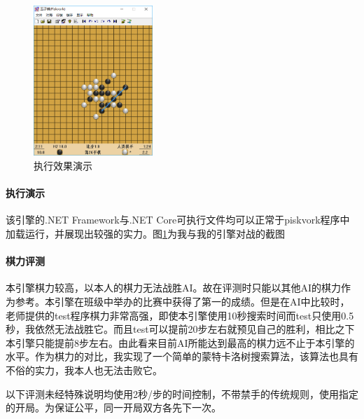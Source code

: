 \documentclass{ctexart}
\begin{document}
\begin{figure}
    \centering
    \includegraphics[width=0.4\textwidth]{assets/executePiskvork.png}
    \caption{执行效果演示}
    \label{fig:piskvork}
\end{figure}

\paragraph{执行演示} 该引擎的.NET Framework与.NET Core可执行文件均可以正常于piskvork程序中加载运行，并展现出较强的实力。图\ref{fig:piskvork}为我与我的引擎对战的截图

\paragraph{棋力评测} 本引擎棋力较高，以本人的棋力无法战胜AI。故在评测时只能以其他AI的棋力作为参考。本引擎在班级中举办的比赛中获得了第一的成绩。但是在AI中比较时，老师提供的test程序棋力非常高强，即使本引擎使用10秒搜索时间而test只使用0.5秒，我依然无法战胜它。而且test可以提前20步左右就预见自己的胜利，相比之下本引擎只能提前8步左右。由此看来目前AI所能达到最高的棋力远不止于本引擎的水平。作为棋力的对比，我实现了一个简单的蒙特卡洛树搜索算法，该算法也具有不俗的实力，我本人也无法击败它。

以下评测未经特殊说明均使用2秒/步的时间控制，不带禁手的传统规则，使用指定的开局。为保证公平，同一开局双方各先下一次。
\end{document}

